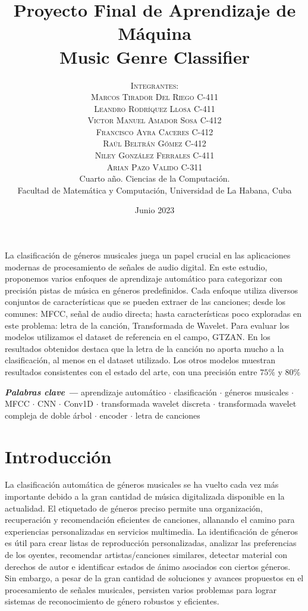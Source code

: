 \documentclass[colorinlistoftodos,twoside,twocolumn,10pt]{article} %
\title{\normalsize{Proyecto Final de Aprendizaje de M\'aquina}\\
	\Huge\bfseries Music Genre Classifier\\
} %
\author{%
	\normalsize\textsc{Integrantes:}\\
	\normalsize\textsc{Marcos Tirador Del Riego  C-411}\\
	\normalsize\textsc{Leandro Rodr\'iquez Llosa  C-411}\\
	\normalsize\textsc{Victor Manuel Amador Sosa C-412}\\
	\normalsize\textsc{Francisco Ayra Caceres C-412}\\
	\normalsize\textsc{Ra\'ul Beltr\'an G\'omez C-412}\\
	\normalsize\textsc{Niley Gonz\'alez Ferrales  C-411}\\
	\normalsize\textsc{Arian Pazo Valido  C-311} \\[2ex]
	\small Cuarto a\~no. Ciencias de la Computaci\'on. \\ %
	\small Facultad de Matem\'atica y Computaci\'on, Universidad de La Habana, Cuba \\ %
}
\date{\footnotesize Junio 2023 } %
\providecommand{\keywords}[1]
{
	\small	
	\vspace{0.5em}
	\noindent \textbf{\textit{Palabras clave --- }} #1
}
\renewenvironment{abstract}
{\small
	\begin{center}
		\bfseries \abstractname\vspace{-.5em}\vspace{0pt}
	\end{center}
	\list{}{
		\setlength{\leftmargin}{0.9cm}%
		\setlength{\rightmargin}{\leftmargin}%
	}%
	\item\relax}
{\endlist}
\begin{document}
	\maketitle

	\begin{abstract}

La clasificaci\'on de g\'eneros musicales juega un papel crucial en las aplicaciones modernas de procesamiento de se\~nales de audio digital. En este estudio, proponemos varios enfoques de aprendizaje autom\'atico para categorizar con precisi\'on pistas de m\'usica en g\'eneros predefinidos. Cada enfoque utiliza diversos conjuntos de caracter\'isticas que se pueden extraer de las canciones; desde los comunes: MFCC, se\~nal de audio directa; hasta caracter\'isticas poco exploradas en este problema: letra de la canci\'on, Transformada de Wavelet. Para evaluar los modelos utilizamos el dataset de referencia en el campo, GTZAN. En los resultados obtenidos destaca que la letra de la canci\'on no aporta mucho a la clasificaci\'on, al menos en el dataset utilizado. Los otros modelos muestran resultados consistentes con el estado del arte, con una precisi\'on entre $75\%$ y $80\%$

		\vspace{1em}
		\keywords{ 
			aprendizaje autom\'atico \textbf{$\cdot$} clasificaci\'on \textbf{$\cdot$}  g\'eneros musicales \textbf{$\cdot$} MFCC  \textbf{$\cdot$} CNN  \textbf{$\cdot$} Conv1D \textbf{$\cdot$} transformada wavelet discreta \textbf{$\cdot$} transformada wavelet compleja de doble \'arbol  \textbf{$\cdot$} encoder  \textbf{$\cdot$} letra de canciones 
		}

	\end{abstract}
	
	
	\section{Introducci\'on}
	La clasificaci\'on autom\'atica de g\'eneros musicales se ha vuelto cada vez m\'as importante debido a la gran cantidad de m\'usica digitalizada disponible en la actualidad. El etiquetado de g\'eneros preciso permite una organizaci\'on, recuperaci\'on y recomendaci\'on eficientes de canciones, allanando el camino para experiencias personalizadas en servicios multimedia. La identificaci\'on de g\'eneros es \'util para crear listas de reproducci\'on personalizadas, analizar las preferencias de los oyentes, recomendar artistas/canciones similares, detectar material con derechos de autor e identificar estados de \'animo asociados con ciertos g\'eneros. Sin embargo, a pesar de la gran cantidad de soluciones y avances propuestos en el procesamiento de se\~nales musicales, persisten varios problemas para lograr sistemas de reconocimiento de g\'enero robustos y eficientes.
\end{document}
